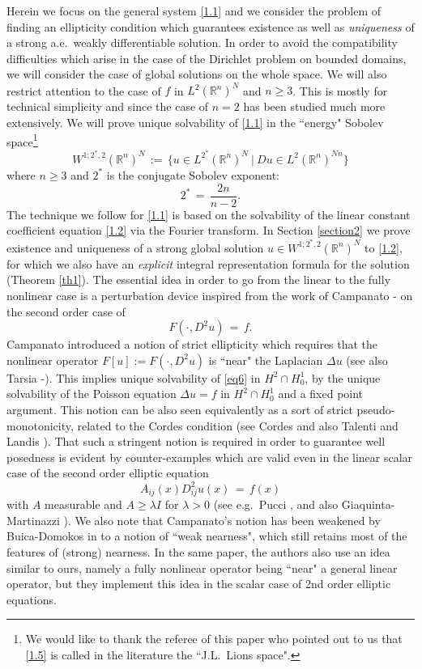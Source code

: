 \documentclass{amsart}
\theoremstyle{definition}
\numberwithin{equation}{section}
\begin{document}
Herein we focus on the general system \eqref{1.1} and we consider the problem of finding an ellipticity condition which guarantees existence as well as \emph{uniqueness} of a strong a.e.\ weakly differentiable solution. In order to avoid the compatibility difficulties which arise in the case of the Dirichlet problem on bounded domains, we will consider the case of global solutions on the whole space. We will also restrict attention to the case of $f$ in $L^2({\mathbb{R}}^n)^N$ and $n\geq 3$. This is mostly for technical simplicity and since the case of $n=2$ has been studied much more extensively. We will prove unique solvability of \eqref{1.1} in the ``energy" Sobolev space\footnote{We would like to thank the referee of this paper who pointed out to us that \eqref{1.5} is called in the literature the ``J.L.\ Lions space".}
\begin{equation} \label{1.5}
W^{1;2^*\!,2}({\mathbb{R}}^n)^N\, :=\, \Big\{ u\in L^{2^*}({\mathbb{R}}^n)^N\ \big| \ Du\in L^{2}({\mathbb{R}}^n)^{Nn}\Big\} 
\end{equation}
where $n\geq 3$ and $2^*$ is the conjugate Sobolev exponent:
\[
2^*\, =\, \frac{2n}{n-2}.
\]
The technique we follow for \eqref{1.1} is based on the solvability of the linear constant coefficient equation \eqref{1.2} via the Fourier transform. In Section \ref{section2} we prove existence and uniqueness of a strong global solution $u\in W^{1;2^*\!,2}({\mathbb{R}}^n)^N$ to \eqref{1.2}, for which we also have an \emph{explicit} integral representation formula for the solution (Theorem \ref{th1}). The essential idea in order to go from the linear to the fully nonlinear case is a perturbation device inspired from the work of Campanato \cite{C0}-\cite{C5} on the second order case of 
\begin{equation} \label{eq6}
F(\cdot,D^2u)\, = \, f.
\end{equation}
Campanato introduced a notion of strict ellipticity which requires that the nonlinear operator $F[u]:=F(\cdot,D^2u)$ is ``near" the Laplacian ${\Delta} u$ (see also Tarsia \cite{Ta1}-\cite{Ta3}). This implies unique solvability of \eqref{eq6} in $H^2\cap H^1_0$, by the unique solvability of the Poisson equation ${\Delta} u =f$ in $H^2\cap H^1_0$ and a fixed point argument. This notion can be also seen equivalently as a sort of strict pseudo-monotonicity, related to the Cordes condition (see Cordes \cite{Co1,Co2} and also Talenti \cite{T} and Landis \cite{L}). That such a stringent notion is required in order to guarantee well posedness is evident by counter-examples which are valid even in the linear scalar case of the second order elliptic equation 
\[
A_{ij}(x)D^2_{ij}u(x)\, =\, f(x) 
\]
with $A$ measurable and $A\geq {\lambda} I$ for ${\lambda}>0$ (see e.g.\ Pucci \cite{P}, and also Giaquinta-Martinazzi \cite{GM}). We also note that Campanato's notion has been weakened by Buica-Domokos in \cite{BD} to a notion of ``weak nearness", which still retains most of the features of (strong) nearness. In the same paper, the authors also use an idea similar to ours, namely a fully nonlinear operator being ``near" a general linear operator, but they implement this idea in the scalar case of 2nd order elliptic equations.
\end{document}
